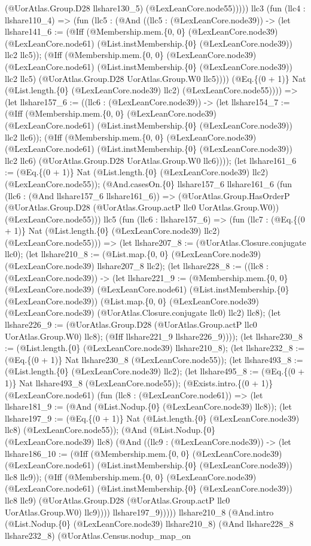 \documentclass[11pt]{article}
\begin{document}
(@UorAtlas.Group.D28 llshare130\_5) (@LexLeanCore.node55))))) llc3 (fun (llc4 : llshare110\_4) => (fun (llc5 : (@And ((llc5 : (@LexLeanCore.node39)) -> (let llshare141\_6 := (@Iff (@Membership.mem.\{0, 0\} (@LexLeanCore.node39) (@LexLeanCore.node61) (@List.instMembership.\{0\} (@LexLeanCore.node39)) llc2 llc5)); (@Iff (@Membership.mem.\{0, 0\} (@LexLeanCore.node39) (@LexLeanCore.node61) (@List.instMembership.\{0\} (@LexLeanCore.node39)) llc2 llc5) (@UorAtlas.Group.D28 UorAtlas.Group.W0 llc5)))) (@Eq.\{(0 + 1)\} Nat (@List.length.\{0\} (@LexLeanCore.node39) llc2) (@LexLeanCore.node55)))) => (let llshare157\_6 := ((llc6 : (@LexLeanCore.node39)) -> (let llshare154\_7 := (@Iff (@Membership.mem.\{0, 0\} (@LexLeanCore.node39) (@LexLeanCore.node61) (@List.instMembership.\{0\} (@LexLeanCore.node39)) llc2 llc6)); (@Iff (@Membership.mem.\{0, 0\} (@LexLeanCore.node39) (@LexLeanCore.node61) (@List.instMembership.\{0\} (@LexLeanCore.node39)) llc2 llc6) (@UorAtlas.Group.D28 UorAtlas.Group.W0 llc6)))); (let llshare161\_6 := (@Eq.\{(0 + 1)\} Nat (@List.length.\{0\} (@LexLeanCore.node39) llc2) (@LexLeanCore.node55)); (@And.casesOn.\{0\} llshare157\_6 llshare161\_6 (fun (llc6 : (@And llshare157\_6 llshare161\_6)) => (@UorAtlas.Group.HasOrderP (@UorAtlas.Group.D28 (@UorAtlas.Group.actP llc0 UorAtlas.Group.W0)) (@LexLeanCore.node55))) llc5 (fun (llc6 : llshare157\_6) => (fun (llc7 : (@Eq.\{(0 + 1)\} Nat (@List.length.\{0\} (@LexLeanCore.node39) llc2) (@LexLeanCore.node55))) => (let llshare207\_8 := (@UorAtlas.Closure.conjugate llc0); (let llshare210\_8 := (@List.map.\{0, 0\} (@LexLeanCore.node39) (@LexLeanCore.node39) llshare207\_8 llc2); (let llshare228\_8 := ((llc8 : (@LexLeanCore.node39)) -> (let llshare221\_9 := (@Membership.mem.\{0, 0\} (@LexLeanCore.node39) (@LexLeanCore.node61) (@List.instMembership.\{0\} (@LexLeanCore.node39)) (@List.map.\{0, 0\} (@LexLeanCore.node39) (@LexLeanCore.node39) (@UorAtlas.Closure.conjugate llc0) llc2) llc8); (let llshare226\_9 := (@UorAtlas.Group.D28 (@UorAtlas.Group.actP llc0 UorAtlas.Group.W0) llc8); (@Iff llshare221\_9 llshare226\_9)))); (let llshare230\_8 := (@List.length.\{0\} (@LexLeanCore.node39) llshare210\_8); (let llshare232\_8 := (@Eq.\{(0 + 1)\} Nat llshare230\_8 (@LexLeanCore.node55)); (let llshare493\_8 := (@List.length.\{0\} (@LexLeanCore.node39) llc2); (let llshare495\_8 := (@Eq.\{(0 + 1)\} Nat llshare493\_8 (@LexLeanCore.node55)); (@Exists.intro.\{(0 + 1)\} (@LexLeanCore.node61) (fun (llc8 : (@LexLeanCore.node61)) => (let llshare181\_9 := (@And (@List.Nodup.\{0\} (@LexLeanCore.node39) llc8)); (let llshare197\_9 := (@Eq.\{(0 + 1)\} Nat (@List.length.\{0\} (@LexLeanCore.node39) llc8) (@LexLeanCore.node55)); (@And (@List.Nodup.\{0\} (@LexLeanCore.node39) llc8) (@And ((llc9 : (@LexLeanCore.node39)) -> (let llshare186\_10 := (@Iff (@Membership.mem.\{0, 0\} (@LexLeanCore.node39) (@LexLeanCore.node61) (@List.instMembership.\{0\} (@LexLeanCore.node39)) llc8 llc9)); (@Iff (@Membership.mem.\{0, 0\} (@LexLeanCore.node39) (@LexLeanCore.node61) (@List.instMembership.\{0\} (@LexLeanCore.node39)) llc8 llc9) (@UorAtlas.Group.D28 (@UorAtlas.Group.actP llc0 UorAtlas.Group.W0) llc9)))) llshare197\_9))))) llshare210\_8 (@And.intro (@List.Nodup.\{0\} (@LexLeanCore.node39) llshare210\_8) (@And llshare228\_8 llshare232\_8) (@UorAtlas.Census.nodup\_map\_on 
\end{document}
